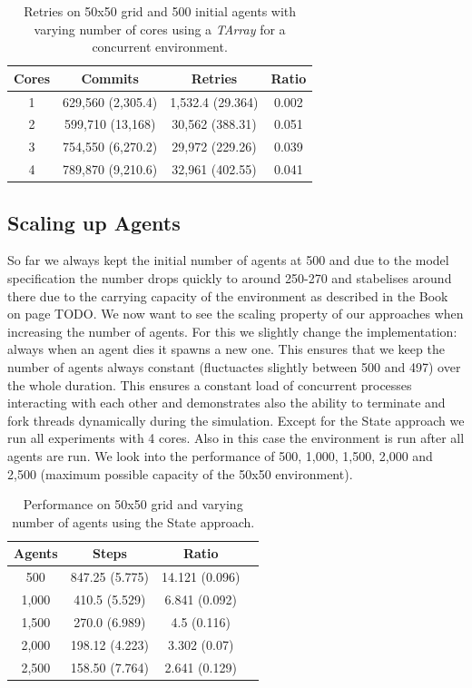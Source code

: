 \begin{table}
	\centering
  	\begin{tabular}{ c || c | c | c }
        Cores & Commits           & Retries          & Ratio \\ \hline \hline 
   		1     & 629,560 (2,305.4) & 1,532.4 (29.364) & 0.002 \\ \hline
    	2     & 599,710 (13,168)  & 30,562 (388.31)  & 0.051 \\ \hline
   		3     & 754,550 (6,270.2) & 29,972 (229.26)  & 0.039 \\ \hline
   		4     & 789,870 (9,210.6) & 32,961 (402.55)  & 0.041 \\ \hline
   	\end{tabular}
  	
  	\caption{Retries on 50x50 grid and 500 initial agents with varying number of cores using a \textit{TArray} for a concurrent environment.}
	\label{tab:tarray_naive_results_concenv_retries}
\end{table}

\subsection{Scaling up Agents}
So far we always kept the initial number of agents at 500 and due to the model specification the number drops quickly to around 250-270 and stabelises around there due to the carrying capacity of the environment as described in the Book on page TODO. We now want to see the scaling property of our approaches when increasing the number of agents. For this we slightly change the implementation: always when an agent dies it spawns a new one. This ensures that we keep the number of agents always constant (fluctuactes slightly between 500 and 497) over the whole duration. This ensures a constant load of concurrent processes interacting with each other and demonstrates also the ability to terminate and fork threads dynamically during the simulation.
Except for the State approach we run all experiments with 4 cores. Also in this case the environment is run after all agents are run. We look into the performance of 500, 1,000, 1,500, 2,000 and 2,500 (maximum possible capacity of the 50x50 environment).

\begin{table}
	\centering
  	\begin{tabular}{ c || c | c | c }
        Agents  & Steps           & Ratio          \\ \hline \hline 
    	500     & 847.25 (5.775)  & 14.121 (0.096) \\ \hline
   		1,000   & 410.5 (5.529)   & 6.841 (0.092)  \\ \hline
   		1,500   & 270.0 (6.989)   & 4.5 (0.116)    \\ \hline
   		2,000   & 198.12 (4.223)  & 3.302 (0.07)   \\ \hline 
   		2,500   & 158.50 (7.764)  & 2.641 (0.129)  \\ \hline 
   	\end{tabular}
  	
  	\caption{Performance on 50x50 grid and varying number of agents using the State approach.}
	\label{tab:state_results_agentsscale_time}
\end{table}

